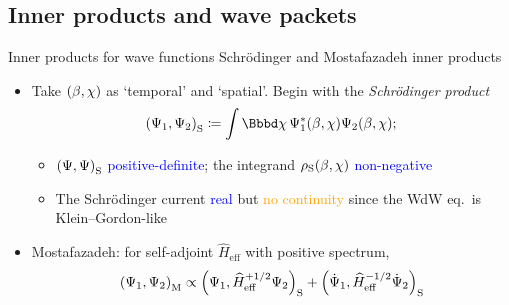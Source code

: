 \documentclass[8pt]{beamer}
\begin{document}
\subsection{Inner products and wave packets}

\begin{frame}%
{Inner products for wave functions}%
{Schrödinger and Mostafazadeh inner products}

\begin{itemize}


\item Take ${\left(\beta, \chi\right)}$ as `temporal' and `spatial'.
Begin with the
\emph{Schrödinger product}
\begin{align}
\rbr{\Psi_1,\Psi_2}_\text{S} \coloneqq
\int \dd \chi\,\rfun{\Psi_1^*}{\beta,\chi} \rfun{\Psi_2}{\beta,\chi};
\end{align}

\begin{itemize}
\item ${\left(\Psi, \Psi\right)}_\text{S}$ \textcolor{blue}{positive-definite};
the integrand ${\rho_\text{S}}\mathopen{}\left(\beta,\chi\right)\mathclose{}$ 
\textcolor{blue}{non-negative}

\item The Schrödinger current \textcolor{blue}{real} but
\textcolor{orange}{no continuity} since the WdW eq.\ is Klein--Gordon-like
\end{itemize}

\item Mostafazadeh: for self-adjoint
$\widehat{H}_\text{eff}$
with positive spectrum,
\begin{align}
{\left(\Psi_1, \Psi_2\right)}_\text{M} \propto
{\left(\Psi_1, \widehat{H}_\text{eff}^{+1/2}\Psi_2\right)}_\text{S}
+{\left(\dot{\Psi}_1,
\widehat{H}_\text{eff}^{-1/2}\dot{\Psi}_2\right)}_\text{S}
\end{align}


\end{itemize}
\end{frame}
\end{document}
